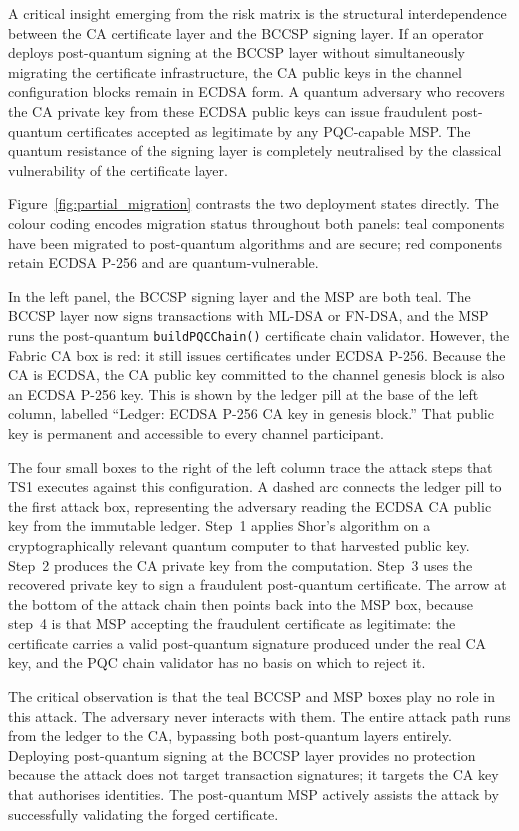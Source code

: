 \documentclass[conference]{IEEEtran}
\begin{document}
A critical insight emerging from the risk matrix is the structural
interdependence between the CA certificate layer and the BCCSP signing
layer. If an operator deploys post-quantum signing at the BCCSP layer
without simultaneously migrating the certificate infrastructure, the CA
public keys in the channel configuration blocks remain in ECDSA form.
A quantum adversary who recovers the CA private key from these ECDSA
public keys can issue fraudulent post-quantum certificates accepted as
legitimate by any PQC-capable MSP. The quantum resistance of the signing
layer is completely neutralised by the classical vulnerability of the
certificate layer.

Figure~\ref{fig:partial_migration} contrasts the two deployment states
directly. The colour coding encodes migration status throughout both panels:
teal components have been migrated to post-quantum algorithms and are secure;
red components retain ECDSA P-256 and are quantum-vulnerable.

In the left panel, the BCCSP signing layer and the MSP are both teal. The
BCCSP layer now signs transactions with ML-DSA or FN-DSA, and the MSP runs
the post-quantum \texttt{buildPQCChain()} certificate chain validator. However,
the Fabric CA box is red: it still issues certificates under ECDSA P-256.
Because the CA is ECDSA, the CA public key committed to the channel genesis
block is also an ECDSA P-256 key. This is shown by the ledger pill at the base
of the left column, labelled ``Ledger: ECDSA P-256 CA key in genesis block.''
That public key is permanent and accessible to every channel participant.

The four small boxes to the right of the left column trace the attack steps
that TS1 executes against this configuration. A dashed arc connects the
ledger pill to the first attack box, representing the adversary reading the
ECDSA CA public key from the immutable ledger. Step~1 applies Shor's algorithm
on a cryptographically relevant quantum computer to that harvested public key.
Step~2 produces the CA private key from the computation. Step~3 uses the
recovered private key to sign a fraudulent post-quantum certificate. The arrow
at the bottom of the attack chain then points back into the MSP box, because
step~4 is that MSP accepting the fraudulent certificate as legitimate: the
certificate carries a valid post-quantum signature produced under the real CA
key, and the PQC chain validator has no basis on which to reject it.

The critical observation is that the teal BCCSP and MSP boxes play no role
in this attack. The adversary never interacts with them. The entire attack path
runs from the ledger to the CA, bypassing both post-quantum layers entirely.
Deploying post-quantum signing at the BCCSP layer provides no protection
because the attack does not target transaction signatures; it targets the CA
key that authorises identities. The post-quantum MSP actively assists the
attack by successfully validating the forged certificate.
\end{document}
